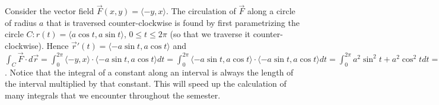 \begin{example}
%
Consider the vector field {$\vec F(x,y)=\langle-y,x\rangle$}.
The circulation of {$\vec F$} along a circle of radius $a$ that is
traversed counter-clockwise is found by first parametrizing the circle
$C\colon r(t) = \langle a\cos t,a\sin t\rangle$, $0\leq t\leq2\pi$ (so that we traverse it
counter-clockwise). Hence $\vec r'(t) = \langle-a\sin t,a\cos t\rangle$ and
$\int_C\vec F\cdot d\vec r = \int_0^{2\pi} \langle-y,x\rangle\cdot \langle-a\sin t,a\cos t\rangle dt =
\int_0^{2\pi} \langle-a\sin t,a\cos t\rangle\cdot \langle-a\sin t,a\cos t\rangle dt = \int_0^{2\pi}
a^2\sin^2 t+a^2\cos^2 t dt = \int_0^{2\pi} a^2 dt = 2\pi a^2$.  Notice that
the integral of a constant along an interval is always the length of
the interval multiplied by that constant.  This will speed up the
calculation of many integrals that we encounter throughout the
semester.
\end{example}

